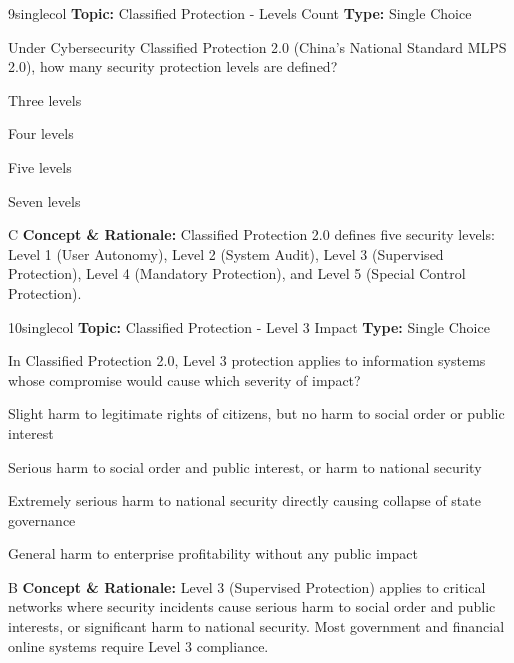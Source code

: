 \begin{qcard}{9}{singlecol}
\textcolor{darkslate!75}{\small\textbf{Topic:} Classified Protection - Levels Count \hfill \textbf{Type:} Single Choice}\vspace{0.4em}\par
Under Cybersecurity Classified Protection 2.0 (China's National Standard MLPS 2.0), how many security protection levels are defined?
\begin{qoptions}
\item Three levels
\item Four levels
\item Five levels
\item Seven levels
\end{qoptions}
\end{qcard}
\nopagebreak
\begin{explainbox}{C}
\textbf{Concept \& Rationale:} Classified Protection 2.0 defines five security levels: Level 1 (User Autonomy), Level 2 (System Audit), Level 3 (Supervised Protection), Level 4 (Mandatory Protection), and Level 5 (Special Control Protection).
\end{explainbox}

\begin{qcard}{10}{singlecol}
\textcolor{darkslate!75}{\small\textbf{Topic:} Classified Protection - Level 3 Impact \hfill \textbf{Type:} Single Choice}\vspace{0.4em}\par
In Classified Protection 2.0, Level 3 protection applies to information systems whose compromise would cause which severity of impact?
\begin{qoptions}
\item Slight harm to legitimate rights of citizens, but no harm to social order or public interest
\item Serious harm to social order and public interest, or harm to national security
\item Extremely serious harm to national security directly causing collapse of state governance
\item General harm to enterprise profitability without any public impact
\end{qoptions}
\end{qcard}
\nopagebreak
\begin{explainbox}{B}
\textbf{Concept \& Rationale:} Level 3 (Supervised Protection) applies to critical networks where security incidents cause serious harm to social order and public interests, or significant harm to national security. Most government and financial online systems require Level 3 compliance.
\end{explainbox}

